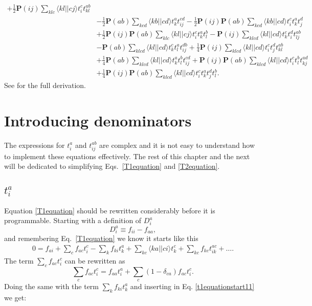 \documentclass[a4paper,norsk,11pt,twoside]{report}
\begin{document}
\begin{align}
+ \frac{1}{2} \textbf{P}(ij) \sum_{klc} \langle kl || cj \rangle t_i^c t_{kl}^{ab} \nonumber \\ &
- \frac{1}{2} \textbf{P}(ab) \sum_{kcd} \langle kb || cd \rangle t_k^a t_{ij}^{cd} 
- \frac{1}{2} \textbf{P}(ij) \textbf{P}(ab) \sum_{kcd} \langle kb||cd \rangle t_i^c t_k^a t_j^d \nonumber \\ &
+ \frac{1}{2} \textbf{P}(ij) \textbf{P}(ab) \sum_{klc} \langle kl || cj \rangle t_i^c t_k^a t_l^b
- \textbf{P}(ij) \sum_{klcd} \langle kl || cd \rangle t_k^c t_i^d t_{lj}^{ab} \nonumber \\ &
- \textbf{P}(ab) \sum_{klcd} \langle kl||cd \rangle t_k^c t_l^a t_{ij}^{db}
+ \frac{1}{4} \textbf{P}(ij) \sum_{klcd} \langle kl || cd \rangle t_i^c t_j^d t_{kl}^{ab} \nonumber \\ &
+ \frac{1}{4} \textbf{P}(ab) \sum_{klcd} \langle kl || cd \rangle t_k^a t_l^b t_{ij}^{cd}
+ \textbf{P}(ij) \textbf{P}(ab) \sum_{klcd} \langle kl || cd \rangle t_i^c t_l^b t_{kj}^{ad} \nonumber \\ &
+ \frac{1}{4} \textbf{P}(ij) \textbf{P} (ab) \sum_{klcd} \langle kl || cd \rangle t_i^c t_k^a t_j^d t_l^b . \nonumber
\end{align}
See \cite{non_refer_numba1} for the full derivation.

\section{Introducing denominators}
The expressions for $t_i^a$ and $t_{ij}^{ab}$ are complex and it is
not easy to understand how to implement these equations
effectively. The rest of this chapter and the next will be dedicated
to simplifying Eqs.~\eqref{T1equation} and \eqref{T2equation}.

\subsection{$t_i^a$}
Equation \eqref{T1equation} should be rewritten considerably before it is programmable. Starting with a definition of $D_i^a$
\begin{equation}
D_i^a \equiv f_{ii} - f_{aa} , \label{D_i_a_def} 
\end{equation}
and remembering Eq.~\eqref{T1equation} we know it starts like this
\begin{align}
0 = f_{ai} + \sum_c f_{ac} t_i^c - \sum_k f_{ki} t_k^a + \sum_{kc} \langle ka||ci \rangle t_k^c + \sum_{kc} f_{kc} t_{ik}^{ac} + \dots . \label{t1equationstart11}
\end{align}
The term $\sum_c f_{ac} t_i^c$ can be rewritten as
\begin{equation}
\sum_c f_{ac} t_i^c = f_{aa} t_i^a + \sum_c 
(1 - \delta_{ca} ) f_{ac} t_i^c .
\end{equation}
Doing the same with the term $\sum_k f_{ki} t_k^a$ and inserting in Eq. \eqref{t1equationstart11} we get:
\end{document}
